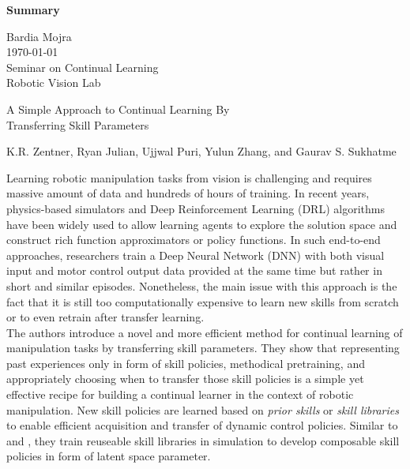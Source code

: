 \documentclass[12pt]{article}
\begin{document}
\begin{center}
\textbf{Summary}\\
\end{center}

\noindent
Bardia Mojra\\
\today\\
Seminar on Continual Learning\\
Robotic Vision Lab\\
\begin{center}
A Simple Approach to Continual Learning By\\
Transferring Skill Parameters\\
\end{center}
\begin{center}
  {\small K.R. Zentner, Ryan Julian, Ujjwal Puri, Yulun Zhang, and Gaurav S. Sukhatme}\\
\end{center}

Learning robotic manipulation tasks from vision is challenging and requires
massive amount of data and hundreds of hours of training. In recent years,
physics-based simulators and Deep Reinforcement Learning (DRL) algorithms have
been widely
used to allow learning agents to explore the solution space and construct rich
function approximators or policy functions. In such end-to-end approaches,
researchers train a Deep Neural Network (DNN) with both visual input and
motor control output data provided at the same time but rather in short and
similar episodes. Nonetheless, the main issue with this approach is the fact
that it is still too computationally expensive to learn new skills from scratch or
to even retrain after transfer learning.\\

\noindent
The authors introduce a novel and more efficient method for
continual learning of manipulation tasks by transferring skill parameters. They
show that representing past experiences only in form of skill policies,
methodical pretraining, and appropriately choosing when to
transfer those skill policies is a simple yet effective recipe for building a
continual learner in the context of robotic manipulation. New skill policies are
learned based on \textit{prior skills} or \textit{skill libraries} to enable
efficient acquisition and transfer of dynamic control policies. Similar to
\cite{hausman2018learning} and \cite{julian2018scaling}, they train reuseable
skill libraries in simulation to develop composable skill policies in form
of latent space parameter.\\
\end{document}
